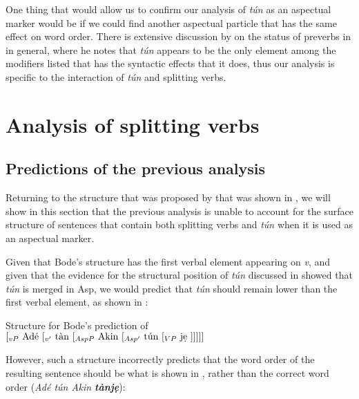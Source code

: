 \documentclass[output=paper,newtxmath,modfonts,nonflat,draftmode]{langsci/langscibook}
\begin{document}
One thing that would allow us to confirm our analysis of \textit{tún} as an aspectual marker would be if we could find another aspectual particle that has the same effect on word order. There is extensive discussion by \citet{Awoyale1974} on the status of preverbs in  in general, where he notes that \textit{tún} appears to be the only element among the modifiers listed that has the syntactic effects that it does, thus our analysis is specific to the interaction of \textit{tún} and splitting verbs.

\section{Analysis of splitting verbs}
\label{sect:parrish:analysis}

\subsection{Predictions of the previous analysis}

Returning to the structure that was proposed by \citet{Bode2007} that was shown in , we will show in this section that the previous analysis is unable to account for the surface structure of sentences that contain both splitting verbs and \textit{tún} when it is used as an aspectual marker.

Given that Bode's structure has the first verbal element appearing on \textit{v}, and given that the evidence for the structural position of \textit{tún} discussed in  showed that \textit{tún} is merged in Asp, we would predict that \textit{tún} should remain lower than the first verbal element, as shown in :

\ea\label{ex:parrish:BodeTunStructure} Structure for Bode's prediction of \\ 

$[_{vP}\text{ Adé } [_{v'}\text{ tàn }[_{AspP}\text{ Akin }[_{Asp'}\text{ tún }[_{VP}\text{ j\d{e} }]]]]]$

\z

However, such a structure incorrectly predicts that the word order of the resulting sentence should be what is shown in , rather than the correct word order (\textit{Adé tún Akin \textbf{tànj\d{e}}}):

\label{ex:parrish:BodeTunSentence}
\z
\end{document}
